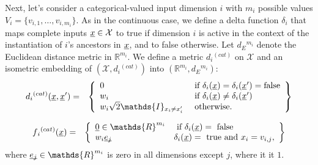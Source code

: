 \documentclass[letterpaper]{article}
\newcommand{\vect}[1]{\underline{\smash{#1}}}
\renewcommand{\v}[1]{\vect{#1}}
\newcommand{\reals}{\mathds{R}}
\newcommand{\indicator}{\ensuremath\mathds{I}}
\begin{document}
Next, let's consider a categorical-valued input dimension $i$ with $m_i$ possible values $V_i = \{v_{i,1}, \dots, v_{i,m_i}\}$. As in the continuous case, we define a delta function $\delta_i$ that maps complete inputs $\v{x} \in \mathcal{X}$ to true if dimension $i$ is active in the context of the instantiation of $i$'s ancestors in $\v{x}$, and to false otherwise. Let $d{_E}^{m_i}$ denote the Euclidean distance metric in $\reals^{m_i}$. We define a metric $d{_i}^{(cat)}$ on $\mathcal{X}$ and an isometric embedding of $(\mathcal{X}, d{_i}^{(cat)})$ into $(\reals^{m_i},d{_E}^{m_i})$:
\begin{eqnarray}
\nonumber{}d{_i}^{(cat)}(\v{x}, \v{x}') & = & \left\{\begin{array}{ll}
\nonumber{} 0 & \textrm{ if } \delta_i(\v{x}) = \delta_i(\v{x}') = \textrm{false}\\
\nonumber{} w_i & \textrm{ if } \delta_i(\v{x}) \neq \delta_i(\v{x}')\\
\nonumber{} w_i \sqrt{2} \indicator_{x_i \neq x_i'} & \textrm{ otherwise. }\end{array}\right\}
\end{eqnarray}

\begin{eqnarray}
\nonumber{}f{_i}^{(cat)}(\v{x}) & = & \left\{\begin{array}{ll}
\v{0} \in \reals^{m_i} & \textrm{ if } \delta_i(\v{x}) = \textrm{ false }\\
\nonumber{} w_i \v{e_j} & \delta_i(\v{x}) = \textrm{ true and } x_i = v_{i,j},
\end{array}\right\}
\end{eqnarray}
\noindent{}where $\v{e_j} \in \reals^{m_i}$ is zero in all dimensions except $j$, where it it $1$.
\end{document}
